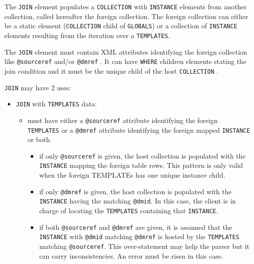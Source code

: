 The \texttt{JOIN} element populates a \texttt{COLLECTION} with \texttt{INSTANCE}  elements from another collection, called hereafter the foreign collection.
The foreign collection can either be a static element  (\texttt{COLLECTION} child of \texttt{GLOBALS}) or a collection of \texttt{INSTANCE} elements resulting from the iteration over a \texttt{TEMPLATES}.

The \texttt{JOIN} element must contain XML attributes identifying the foreign collection  like \texttt{@sourceref}  and/or \texttt{@dmref} . 
It can have \texttt{WHERE} children elements stating the join condition and it must be the unique child of the host \texttt{COLLECTION} .

 \texttt{JOIN} may have 2 uses:

\begin{itemize}

    \item \texttt{JOIN}  with \texttt{TEMPLATES} data:
       \begin{itemize}
         \item must have either a \texttt{@sourceref} attribute identifying the foreign \texttt{TEMPLATES} or a \texttt{@dmref} attribute identifying the foreign mapped \texttt{INSTANCE} or both.
             \begin{itemize}
               \item if only \texttt{@sourceref} is given, the host collection is populated with the \texttt{INSTANCE}  mapping the foreign table rows. 
                        This pattern is only valid when the foreign TEMPLATEs has  one unique instance child.
               \item if only \texttt{@dmref} is given,  the host collection is populated with the \texttt{INSTANCE}  having the matching \texttt{@dmid}. In this case, 
                        the client is in charge of locating the \texttt{TEMPLATES} containing that \texttt{INSTANCE}.
               \item if both \texttt{@sourceref} and \texttt{@dmref} are given, it is assumed that the \texttt{INSTANCE} with \texttt{@dmid} matching \texttt{@dmref} is hosted by the \texttt{TEMPLATES} matching \texttt{@sourceref}.
                        This over-statement may help the parser but it can carry inconsistencies. An error must be risen in this case.
             \end{itemize}
    \end{itemize}
  

\end{itemize}
